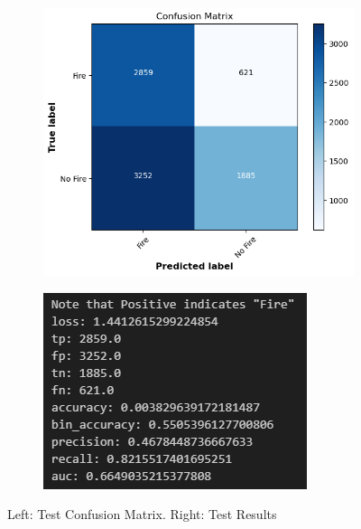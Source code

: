 \documentclass[a4paper,11pt]{article} %
\begin{document}
\begin{figure}[h]
    \centering
    \begin{subfigure}[b]{0.45\textwidth}
        \centering
        \includegraphics[width=\textwidth]{../figures/test_confusion_matrix.png}
    \end{subfigure}
    \hfill
    \begin{subfigure}[b]{0.45\textwidth}
        \centering
        \includegraphics[width=\textwidth]{../figures/Test_results.png}
    \end{subfigure}
    \caption{Left: Test Confusion Matrix. Right: Test Results}
    \label{fig:TestResult}
\end{figure}
\end{document}
